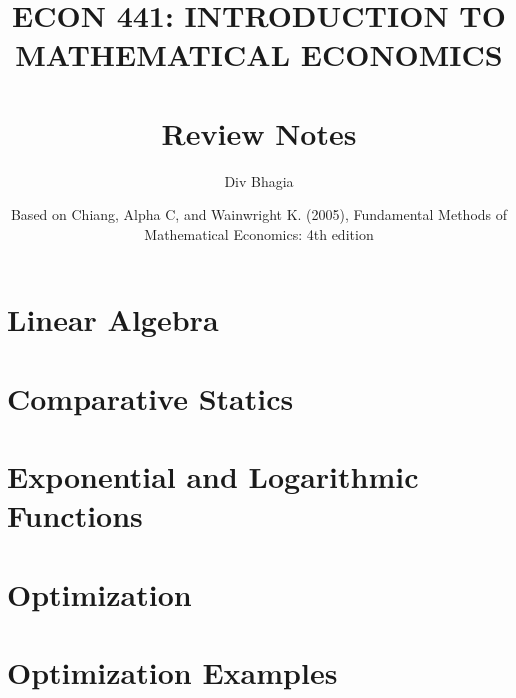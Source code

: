 \documentclass{./../../latex/allnotes}
\numberwithin{section}{chapter}
\numberwithin{subsection}{section}
\begin{document}
\title{\uppercase{ Econ 441: Introduction to Mathematical Economics} \\~\\ Review Notes}
\author{Div Bhagia}
\date{Based on Chiang, Alpha C, and Wainwright K. (2005), Fundamental Methods of Mathematical Economics: 4th edition}

\begin{titlepage}
  \setcounter{tocdepth}{1}
    \maketitle
    \tableofcontents    
\end{titlepage}

\chapter{Linear Algebra}

\rhead{\chaptername}

\chapter{Comparative Statics}


\chapter{Exponential and Logarithmic Functions}


\chapter{Optimization}


\chapter{Optimization Examples}

\end{document}
